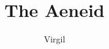 \documentclass[12pt]{book}
\title{The Aeneid}
\author{Virgil}
\date{}
\newcommand\newchapter[1]{%
}
\begin{document}


    \begin{linenumbers}
        \raggedright
        \setlength{\parindent}{1em}
        \setlength{\parskip}{0pt}

        
    \end{linenumbers}

    \printcommonglossary
    \printuncommonglossary
\end{document}
